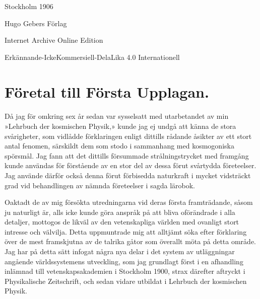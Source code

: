 \documentclass[a4paper, 12pt, oneside, swedish]{article}
\begin{document}
\begin{titlepage}
	
	

	\vspace*{\fill}%
	
	Stockholm 1906 %
	
	{\small Hugo Gebers Förlag} %

	\vspace{1\baselineskip} %

        Internet Archive Online Edition  %
	
	{\small Erkännande-IckeKommersiell-DelaLika 4.0 Internationell } %
\end{titlepage}
\setlength{\parskip}{1mm plus1mm minus1mm}
\clearpage
\pagestyle{fancy}
\fancyhf{}
\cfoot{\Fontauri{\thepage}}
\Large
\tableofcontents
\clearpage
\listoffigures
\clearpage
\section*{Företal till Första Upplagan.}
\paragraph{}
Då jag för omkring sex år sedan var sysselsatt med utarbetandet av min »Lehrbuch der kosmischen Physik,» kunde jag ej undgå att känna de stora svårigheter, som vidlådde förklaringen enligt dittills rådande åsikter av ett stort antal fenomen, särskildt dem som stodo i sammanhang med kosmogoniska spörsmål. Jag fann att det dittills försummade strålningstrycket med framgång kunde användas för förstående av en stor del av dessa förut svårtydda företeelser. Jag använde därför också denna förut förbisedda naturkraft i mycket vidsträckt grad vid behandlingen av nämnda företeelser i sagda lärobok.

Oaktadt de av mig försökta utredningarna vid deras första framträdande, såsom ju naturligt är, alls icke kunde göra anspråk på att bliva oförändrade i alla detaljer, mottogos de likväl av den vetenskapliga världen med ovanligt stort intresse och välvilja. Detta uppmuntrade mig att alltjämt söka efter förklaring över de mest framskjutna av de talrika gåtor som överallt möta på detta område. Jag har på detta sätt infogat några nya delar i det system av utläggningar angående världssystemens utveckling, som jag grundlagt först i en afhandling inlämnad till vetenskapsakademien i Stockholm 1900, strax därefter aftryckt i Physikalische Zeitschrift, och sedan vidare utbildat i Lehrbuch der kosmischen Physik.
\end{document}
